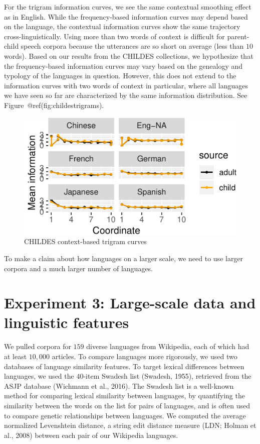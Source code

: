\documentclass[10pt, letterpaper]{article}
\newenvironment{CodeChunk}{}{}
\begin{document}
For the trigram information curves, we see the same contextual smoothing
effect as in English. While the frequency-based information curves may
depend based on the language, the contextual information curves show the
same trajectory cross-linguistically. Using more than two words of
context is difficult for parent-child speech corpora because the
utterances are so short on average (less than \(10\) words). Based on
our results from the CHILDES collections, we hypothesize that the
frequency-based information curves may vary based on the genealogy and
typology of the languages in question. However, this does not extend to
the information curves with two words of context in particular, where
all languages we have seen so far are characterized by the same
information distribution. See Figure~@ref(fig:childestrigrams).

\begin{CodeChunk}
\begin{figure}[tb]
\includegraphics{figs/childestrigrams-1} \caption[CHILDES context-based trigram curves]{CHILDES context-based trigram curves}\label{fig:childestrigrams}
\end{figure}
\end{CodeChunk}

To make a claim about how languages on a larger scale, we need to use
larger corpora and a much larger number of languages.

\hypertarget{experiment-3-large-scale-data-and-linguistic-features}{%
\section{Experiment 3: Large-scale data and linguistic
features}\label{experiment-3-large-scale-data-and-linguistic-features}}

We pulled corpora for \(159\) diverse languages from Wikipedia, each of
which had at least \(10,000\) articles. To compare languages more
rigorously, we used two databases of language similarity features. To
target lexical differences between languages, we used the \(40\)-item
Swadesh list (Swadesh, 1955), retrieved from the ASJP database (Wichmann
et al., 2016). The Swadesh list is a well-known method for comparing
lexical similarity between languages, by quantifying the similarity
between the words on the list for pairs of languages, and is often used
to compare genetic relationships between languages. We computed the
average normalized Levenshtein distance, a string edit distance measure
(LDN; Holman et al., 2008) between each pair of our Wikipedia languages.
\end{document}
